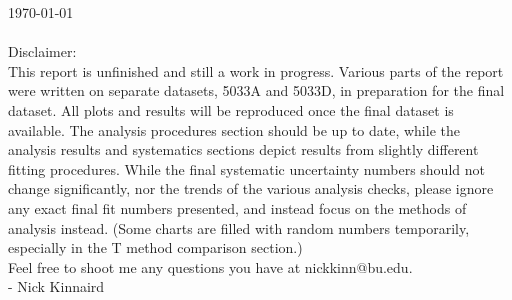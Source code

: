 \clearpage

\today \\ \\
Disclaimer: \\

This report is unfinished and still a work in progress. Various parts of the report were written on separate datasets, 5033A and 5033D, in preparation for the final dataset. All plots and results will be reproduced once the final dataset is available. The analysis procedures section should be up to date, while the analysis results and systematics sections depict results from slightly different fitting procedures. While the final systematic uncertainty numbers should not change significantly, nor the trends of the various analysis checks, please ignore any exact final fit numbers presented, and instead focus on the methods of analysis instead. (Some charts are filled with random numbers temporarily, especially in the T method comparison section.) \\

Feel free to shoot me any questions you have at nickkinn@bu.edu. \\ 

- Nick Kinnaird


\clearpage
